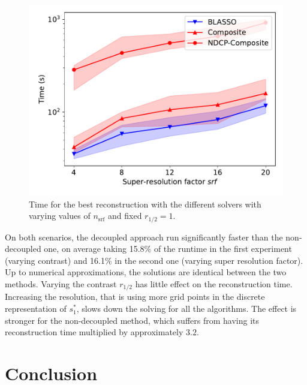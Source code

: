 \documentclass[12pt]{article}
\begin{document}
        \begin{figure}[p]
            \centering
            \includegraphics[width=.7\linewidth]{figures/benchmark/time_vs_srf.pdf}        
            \caption{Time for the best reconstruction with the different solvers with varying values of $n_\mathrm{srf}$ and fixed $r_{1/2}=1$.}
            \label{fig:time-vs-srf}
        \end{figure}
    
        On both scenarios, the decoupled approach run significantly faster than the non-decoupled one, on average taking 15.8\% of the runtime in the first experiment (varying contrast) and 16.1\% in the second one (varying super resolution factor). Up to numerical approximations, the solutions are identical between the two methods.
        Varying the contrast $r_{1/2}$ has little effect on the reconstruction time. Increasing the resolution, that is using more grid points in the discrete representation of $s_1^*$, slows down the solving for all the algorithms. The effect is stronger for the non-decoupled method, which suffers from having its reconstruction time multiplied by approximately $3.2$.

        

\section{Conclusion}

\end{document}
